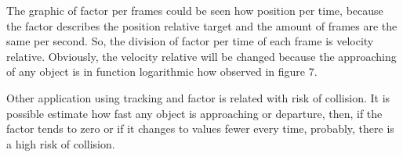 The graphic of factor per frames could be seen how position per time, 
because the factor describes the position relative target and the amount of 
frames are the same per second. So, the division of factor per time of 
each frame is velocity relative. Obviously, the velocity relative will be 
changed because the approaching of any object is in function logarithmic 
how observed in figure 7.

Other application using tracking and factor is related with risk of collision. 
It is possible estimate how fast any object is approaching 
or departure, then, if the factor tends to zero or if it changes to values 
fewer every time, probably, there is a high risk of collision.


